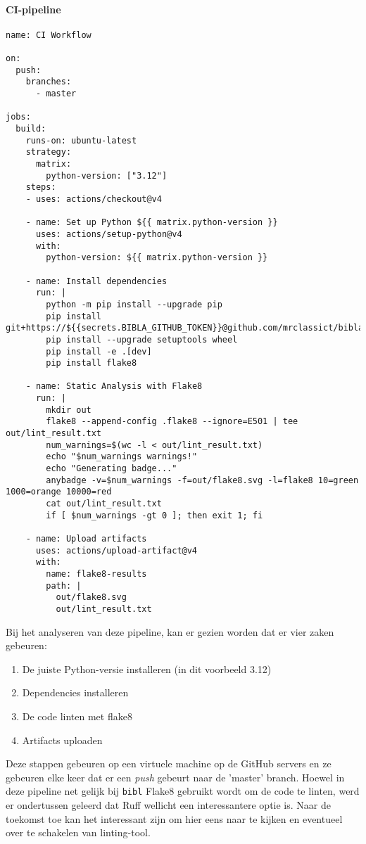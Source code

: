 \paragraph{CI-pipeline}
\begin{verbatim}
name: CI Workflow

on:
  push:
    branches:
      - master

jobs:
  build:
    runs-on: ubuntu-latest
    strategy:
      matrix:
        python-version: ["3.12"]
    steps:
    - uses: actions/checkout@v4

    - name: Set up Python ${{ matrix.python-version }}
      uses: actions/setup-python@v4
      with:
        python-version: ${{ matrix.python-version }}

    - name: Install dependencies
      run: |
        python -m pip install --upgrade pip
        pip install git+https://${{secrets.BIBLA_GITHUB_TOKEN}}@github.com/mrclassict/bibla.git
        pip install --upgrade setuptools wheel
        pip install -e .[dev]
        pip install flake8

    - name: Static Analysis with Flake8
      run: |
        mkdir out
        flake8 --append-config .flake8 --ignore=E501 | tee out/lint_result.txt
        num_warnings=$(wc -l < out/lint_result.txt)
        echo "$num_warnings warnings!"
        echo "Generating badge..."
        anybadge -v=$num_warnings -f=out/flake8.svg -l=flake8 10=green 1000=orange 10000=red
        cat out/lint_result.txt
        if [ $num_warnings -gt 0 ]; then exit 1; fi

    - name: Upload artifacts
      uses: actions/upload-artifact@v4
      with:
        name: flake8-results
        path: |
          out/flake8.svg
          out/lint_result.txt
\end{verbatim}

Bij het analyseren van deze pipeline, kan er gezien worden dat er vier zaken gebeuren:
\begin{enumerate}
    \item De juiste Python-versie installeren (in dit voorbeeld 3.12)
    \item Dependencies installeren
    \item De code linten met flake8
    \item Artifacts uploaden
\end{enumerate}

Deze stappen gebeuren op een virtuele machine op de GitHub servers en ze gebeuren elke keer dat er een \emph{push} gebeurt naar de 'master' branch.
Hoewel in deze pipeline net gelijk bij \texttt{bibl} Flake8 gebruikt wordt om de code te linten, werd er ondertussen geleerd dat Ruff wellicht een interessantere optie is. Naar de toekomst toe kan het interessant zijn om hier eens naar te kijken en eventueel over te schakelen van linting-tool.


